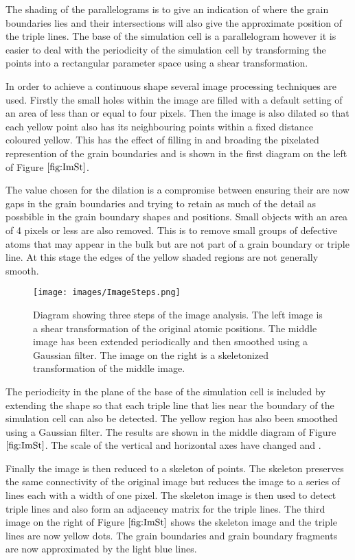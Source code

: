 \documentclass[12pt,a4paper]{book}
\begin{document}
The shading of the parallelograms is to give an indication of where the grain boundaries lies and their intersections will also give the approximate position of the triple lines. The base of the simulation cell is a parallelogram however it is easier to deal with the periodicity of the simulation cell by transforming the points into a rectangular parameter space using a shear transformation. 

In order to achieve a continuous shape several image processing techniques are used. Firstly the small holes within the image are filled with a default setting of an area of less than or equal to four pixels. Then the image is also dilated so that each yellow point also has its neighbouring points within a fixed distance coloured yellow. This has the effect of filling in and broading the pixelated represention of the grain boundaries and is shown in the first diagram on the left of Figure $\ref{fig:ImSt}$. 

The value chosen for the dilation is a compromise between ensuring their are now gaps in the grain boundaries and trying to retain as much of the detail as possbible in the grain boundary shapes and positions. Small objects with an area of 4 pixels or less are also removed. This is to remove small groups of defective atoms that may appear in the bulk but are not part of a grain boundary or triple line. At this stage the edges of the yellow shaded regions are not generally smooth.

 
\begin{figure}[H]
	\centering
	\texttt{[image: images/ImageSteps.png]} 
	\caption{Diagram showing three steps of the image analysis. The left image is a shear transformation of the original atomic positions. The middle image has been extended periodically and then smoothed using a Gaussian filter. The image on the right is a skeletonized transformation of the middle image.}  
	\label{fig:ImSt}
\end{figure}


The periodicity in the plane of the base of the simulation cell is included by extending the shape so that each triple line that lies near the boundary of the simulation cell can also be detected. The yellow region has also been smoothed using a Gaussian filter. The results are shown in the middle diagram of Figure $\ref{fig:ImSt}$. The scale of the vertical and horizontal axes have changed and . 

Finally the image is then reduced to a skeleton of points. The skeleton preserves the same connectivity of the original image but reduces the image to a series of lines each with a width of one pixel. The skeleton image is then used to detect triple lines and also form an adjacency matrix for the triple lines. The third image on the right of Figure $\ref{fig:ImSt}$ shows the skeleton image and the triple lines are now yellow dots. The grain boundaries and grain boundary fragments are now approximated by the light blue lines.
\end{document}
